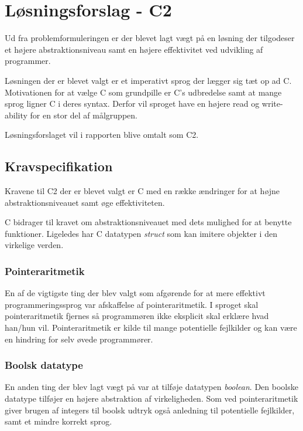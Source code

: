 \section{Løsningsforslag - C2}
Ud fra problemformuleringen er der blevet lagt vægt på en løsning der tilgodeser et højere abstraktionsniveau samt en højere effektivitet ved udvikling af programmer. 

Løsningen der er blevet valgt er et imperativt sprog der lægger sig tæt op ad C. Motivationen for at vælge C som grundpille er C's udbredelse samt at mange sprog ligner C i deres syntax. Derfor vil sproget have en højere read og write-ability for en stor del af målgruppen.

Løsningsforslaget vil i rapporten blive omtalt som C2.

\subsection{Kravspecifikation}
Kravene til C2 der er blevet valgt er C med en række ændringer for at højne abstraktionsniveauet samt øge effektiviteten.

C bidrager til kravet om abstraktionsniveauet med dets mulighed for at benytte funktioner. Ligeledes har C datatypen \textit{struct} som kan imitere objekter i den virkelige verden. 

\subsubsection{Pointeraritmetik}
En af de vigtigste ting der blev valgt som afgørende for at mere effektivt programmeringssprog var afskaffelse af pointeraritmetik. I sproget skal pointeraritmetik fjernes så programmøren ikke eksplicit skal erklære hvad han/hun vil. Pointeraritmetik er kilde til mange potentielle fejlkilder og kan være en hindring for selv øvede programmører.


\subsubsection{Boolsk datatype}
En anden ting der blev lagt vægt på var at tilføje datatypen \textit{boolean}. Den boolske datatype tilføjer en højere abstraktion af virkeligheden. Som ved pointeraritmetik giver brugen af integers til boolsk udtryk også anledning til potentielle fejlkilder, samt et mindre korrekt sprog.

